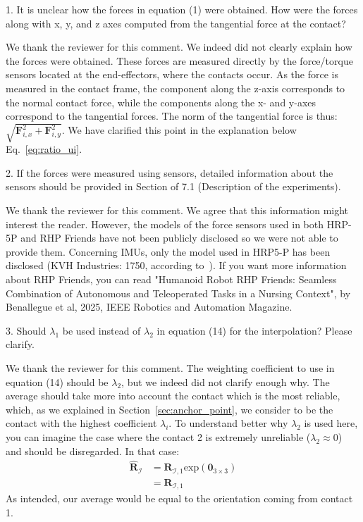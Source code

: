 \begin{revquote}
1. It is unclear how the forces in equation (1) were obtained. How were the forces along with x, y, and z axes computed from the tangential force at the contact?
\end{revquote}

We thank the reviewer for this comment. We indeed did not clearly explain how the forces were obtained. These forces are measured directly by the force/torque sensors located at the end-effectors, where the contacts occur. As the force is measured in the contact frame, the component along the z-axis corresponds to the normal contact force, while the components along the x- and y-axes correspond to the tangential forces. The norm of the tangential force is thus:
$\sqrt{\boldsymbol{F}_{i,x}^2 + \boldsymbol{F}_{i,y}^2}$. We have clarified this point in the explanation below Eq.~\eqref{eq:ratio_ui}.

\begin{revquote}
2. If the forces were measured using sensors, detailed information about the sensors should be provided in Section of 7.1 (Description of the experiments).
\end{revquote}

We thank the reviewer for this comment. We agree that this information might interest the reader. However, the models of the force sensors used in both HRP-5P and RHP Friends have not been publicly disclosed so we were not able to provide them. Concerning IMUs, only the model used in HRP5-P has been disclosed (KVH Industries: 1750, according to~\cite{Kaneko2019Hrp5}). 
If you want more information about RHP Friends, you can read "Humanoid Robot RHP Friends: Seamless Combination of Autonomous and Teleoperated Tasks in a Nursing Context", by Benallegue et al, 2025, IEEE Robotics and Automation Magazine.

\begin{revquote}
3. Should $\lambda_1$ be used instead of $\lambda_2$ in equation (14) for the interpolation? Please clarify.
\end{revquote}

We thank the reviewer for this comment. The weighting coefficient to use in equation (14) should be $\lambda_2$, but we indeed did not clarify enough why. The average should take more into account the contact which is the most reliable, which, as we explained in Section~\ref{sec:anchor_point}, we consider to be the contact with the highest coefficient $\lambda_{i}$.
To understand better why $\lambda_{2}$ is used here, you can imagine the case where the contact 2 is extremely unreliable ($\lambda_{2} \approx 0$) and should be disregarded. In that case:
\begin{align}
    \hat{\boldsymbol{R}}_{\mathcal{I}}& = \boldsymbol{R}_{\mathcal{I}, 1} \text{exp} \left( \boldsymbol{0}_{3\times3}  \right) \\ 
    & =  \boldsymbol{R}_{\mathcal{I}, 1} 
\end{align} 
As intended, our average would be equal to the orientation coming from contact 1.

